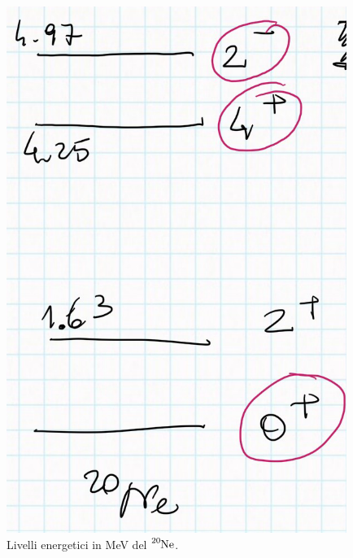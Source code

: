\begin{figure}[h]
	\centering
	\includegraphics[scale=0.5]{Immagini/0428_lv.png}
	\caption{Livelli energetici in MeV del $\ce{^{20}Ne}$.}
	\label{0428_ne}
\end{figure}

